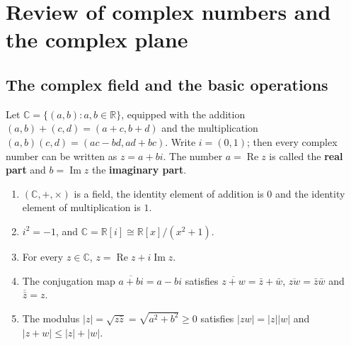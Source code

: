 \section{Review of complex numbers and the complex plane}

\subsection{The complex field and the basic operations}

\begin{definition}\label{def:ca_complex_field}
Let $\mathbb{C} = \{(a,b) : a, b \in \mathbb{R}\}$, equipped with the addition $(a,b) + (c,d) = (a+c, b+d)$ and the multiplication $(a,b)(c,d) = (ac - bd, ad + bc)$. Write $i = (0,1)$; then every complex number can be written as $z = a + bi$. The number $a = \operatorname{Re} z$ is called the \textbf{real part} and $b = \operatorname{Im} z$ the \textbf{imaginary part}.
\end{definition}

\begin{proposition}\label{prop:ca_complex_field_props}
\begin{enumerate}[label=(\roman*)]
    \item $(\mathbb{C}, +, \times)$ is a field, the identity element of addition is $0$ and the identity element of multiplication is $1$.
    \item $i^2 = -1$, and $\mathbb{C} = \mathbb{R}[i] \cong \mathbb{R}[x]/(x^2+1)$.
    \item For every $z \in \mathbb{C}$, $z = \operatorname{Re} z + i \operatorname{Im} z$.
    \item The conjugation map $\overline{a+bi} = a - bi$ satisfies $\overline{z+w} = \bar{z} + \bar{w}$, $\overline{zw} = \bar{z} \bar{w}$ and $\overline{\bar{z}} = z$.
    \item The modulus $|z| = \sqrt{z\bar{z}} = \sqrt{a^2 + b^2} \ge 0$ satisfies $|zw| = |z| |w|$ and $|z+w| \le |z| + |w|$.
\end{enumerate}
\end{proposition}

